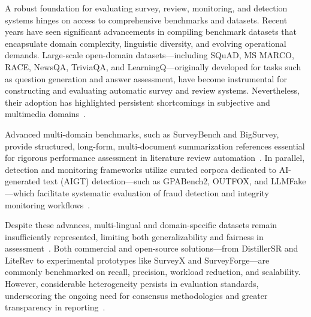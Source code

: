 A robust foundation for evaluating survey, review, monitoring, and detection systems hinges on access to comprehensive benchmarks and datasets. Recent years have seen significant advancements in compiling benchmark datasets that encapsulate domain complexity, linguistic diversity, and evolving operational demands. Large-scale open-domain datasets—including SQuAD, MS MARCO, RACE, NewsQA, TriviaQA, and LearningQ—originally developed for tasks such as question generation and answer assessment, have become instrumental for constructing and evaluating automatic survey and review systems. Nevertheless, their adoption has highlighted persistent shortcomings in subjective and multimedia domains~\cite{ref77,ref78,ref80}.

Advanced multi-domain benchmarks, such as SurveyBench and BigSurvey, provide structured, long-form, multi-document summarization references essential for rigorous performance assessment in literature review automation~\cite{ref102,ref104}. In parallel, detection and monitoring frameworks utilize curated corpora dedicated to AI-generated text (AIGT) detection—such as GPABench2, OUTFOX, and LLMFake—which facilitate systematic evaluation of fraud detection and integrity monitoring workflows~\cite{ref91,ref94,ref95}.

Despite these advances, multi-lingual and domain-specific datasets remain insufficiently represented, limiting both generalizability and fairness in assessment~\cite{ref92,ref113}. Both commercial and open-source solutions—from DistillerSR and LiteRev to experimental prototypes like SurveyX and SurveyForge—are commonly benchmarked on recall, precision, workload reduction, and scalability. However, considerable heterogeneity persists in evaluation standards, underscoring the ongoing need for consensus methodologies and greater transparency in reporting~\cite{ref88,ref90,ref91,ref92,ref111,ref112,ref113,ref114,ref115}.


